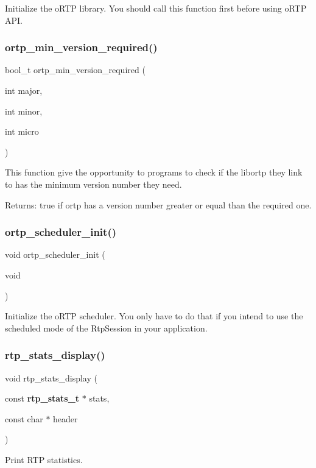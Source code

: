 Initialize the o\+R\+TP library. You should call this function first before using o\+R\+TP A\+PI. \mbox{\label{ortp_8h_aa04f26740f760e228c4443fbfdd4f5ea}} 
\subsubsection{ortp\+\_\+min\+\_\+version\+\_\+required()}
{\footnotesize\ttfamily bool\+\_\+t ortp\+\_\+min\+\_\+version\+\_\+required (\begin{DoxyParamCaption}\item[{int}]{major,  }\item[{int}]{minor,  }\item[{int}]{micro }\end{DoxyParamCaption})}

This function give the opportunity to programs to check if the libortp they link to has the minimum version number they need.

Returns\+: true if ortp has a version number greater or equal than the required one. \mbox{\label{ortp_8h_a5e141585e75d0b7fca43797088f2b04e}} 
\subsubsection{ortp\+\_\+scheduler\+\_\+init()}
{\footnotesize\ttfamily void ortp\+\_\+scheduler\+\_\+init (\begin{DoxyParamCaption}\item[{void}]{ }\end{DoxyParamCaption})}

Initialize the o\+R\+TP scheduler. You only have to do that if you intend to use the scheduled mode of the Rtp\+Session in your application. \mbox{\label{ortp_8h_ad4b2b584a56ce6251ba3b6cf9df02c3e}} 
\subsubsection{rtp\+\_\+stats\+\_\+display()}
{\footnotesize\ttfamily void rtp\+\_\+stats\+\_\+display (\begin{DoxyParamCaption}\item[{const \textbf{ rtp\+\_\+stats\+\_\+t} $\ast$}]{stats,  }\item[{const char $\ast$}]{header }\end{DoxyParamCaption})}

Print R\+TP statistics. 